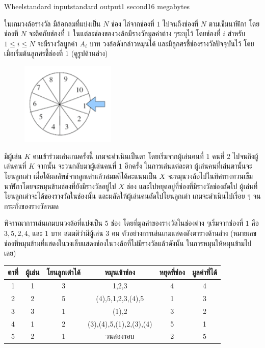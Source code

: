 \documentclass[11pt,a4paper]{article}
\begin{document}
\begin{problem}{Wheel}{standard input}{standard output}{1 second}{16 megabytes}

ในเกมวงล้อรางวัล มีล้อกลมที่แบ่งเป็น $N$ ช่อง ไล่จากช่องที่ $1$ ไปจนถึงช่องที่ $N$ ตามเข็มนาฬิกา โดยช่องที่ $N$ จะติดกับช่องที่ $1$ ในแต่ละช่องของวงล้อมีรางวัลมูลค่าต่าง ๆระบุไว้ โดยช่องที่ $i$ สำหรับ $1 \leq i \leq N$ จะมีรางวัลมูลค่า $A_i$ บาท วงล้อดังกล่าวหมุนได้ และมีลูกศรชี้ช่องรางวัลปัจจุบันไว้ โดยเมื่อเริ่มต้นลูกศรชี้ช่องที่ $1$ (ดูรูปด้านล่าง)

\begin{figure}[h]
\centering
\includegraphics[width=0.4\textwidth]{../latex/img/1055/1055-1.png}
\end{figure}

มีผู้เล่น $K$ คนเข้าร่วมเล่นเกมครั้งนี้ เกมจะดำเนินเป็นตา โดยเริ่มจากผู้เล่นคนที่ $1$ คนที่ $2$ ไปจนถึงผู้เล่นคนที่ $K$ จากนั้น จะวนกลับมาผู้เล่นคนที่ $1$ อีกครั้ง ในการเล่นแต่ละตา ผู้เล่นคนที่เล่นตานั้นจะโยนลูกเต๋า เมื่อได้ผลลัพธ์จากลูกเต๋าแล้วสมมติได้คะแนนเป็น $X$ จะหมุนวงล้อไปในทิศทางทวนเข็มนาฬิกาโดยจะหมุนข้ามช่องที่ยังมีรางวัลอยู่ไป $X$ ช่อง และไปหยุดอยู่ที่ช่องที่มีรางวัลช่องถัดไป ผู้เล่นที่โยนลูกเต๋าจะได้ของรางวัลในช่องนั้น และผลัดให้ผู้เล่นคนถัดไปโยนลูกเต๋า เกมจะดำเนินไปเรื่อย ๆ จนกระทั่งของรางวัลหมด

พิจารณาการเล่นเกมบนวงล้อที่แบ่งเป็น $5$ ช่อง โดยที่มูลค่าของรางวัลในช่องต่าง ๆเริ่มจากช่องที่ $1$ คือ $3, 5, 2, 4$, และ $1$ บาท สมมติว่ามีผู้เล่น $3$ คน ตัวอย่างการเล่นเกมแสดงดังตารางด้านล่าง (หมายเลขช่องที่หมุนข้ามที่แสดงในวงเล็บแสดงช่องในวงล้อที่ไม่มีรางวัลแล้วดังนั้น ในการหมุนให้หมุนข้ามไปเลย)

\begin{center}
		\begin{tabular}{|c|c|c|c|c|c|}
\hline
\textbf{ตาที่}	& \textbf{ผู้เล่น}& \textbf{โยนลูกเต๋าได้}&	\textbf{หมุนเข้าช่อง} & \textbf{หยุดที่ช่อง}	& \textbf{มูลค่าที่ได้}\\
\hline \hline
1	&1	&3	&1,2,3	&4	&4\\
\hline
2	&2&	5	&(4),5,1,2,3,(4),5	&1	&3\\
\hline
3	&3	&1	&(1),2	&3	&2\\
\hline
4	&1	&2	&(3),(4),5,(1),2,(3),(4)	&5	&1\\
\hline
5	&2	&1	&วนสองรอบ	&2	&5\\
\hline
\end{tabular}
\end{center}


\end{problem}
\end{document}
